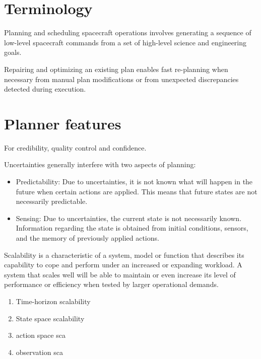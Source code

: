 \documentclass[conference]{IEEEtran}
\begin{document}
\section{Terminology}
Planning and scheduling spacecraft operations involves generating a sequence of low-level spacecraft commands from a set of high-level science and engineering goals.


Repairing and optimizing an existing plan enables fast re-planning when necessary from manual plan modifications or from unexpected discrepancies detected during execution.


\section{Planner features}

For credibility, quality control and confidence.

Uncertainties generally interfere with two aspects of planning:
\begin{itemize}
\item Predictability: Due to uncertainties, it is not known what will happen in the future when certain actions are applied. This means that future states are not necessarily predictable.
\item Sensing: Due to uncertainties, the current state is not necessarily known. Information regarding the state is obtained from initial conditions, sensors, and the memory of previously applied actions.
\end{itemize}

Scalability is a characteristic of a system, model or function that describes its capability to cope and perform under an increased or expanding workload. A system that scales well will be able to maintain or even increase its level of performance or efficiency when tested by larger operational demands.
\begin{enumerate}
    \item Time-horizon scalability
    \item State space scalability
    \item action space sca
    \item observation sca
\end{enumerate}
\end{document}
